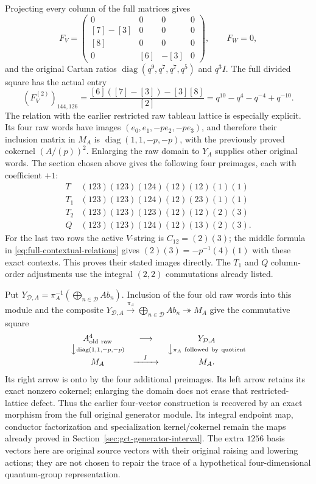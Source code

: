 Projecting every column of the full matrices gives
\[
 F_V=\begin{pmatrix}0&0&0&0\\
 [7]-[3]&0&0&0\\{}[8]&0&0&0\\0&[6]&-[3]&0
 \end{pmatrix},\qquad F_W=0,
\]
and the original Cartan ratios
$\operatorname{diag}(q^9,q^7,q^7,q^5)$ and $q^3I$.
The full divided square has the actual entry
\[
 (F_V^{(2)})_{144,126}
 =\frac{[6]([7]-[3])-[3][8]}{[2]}
 =q^{10}-q^4-q^{-4}+q^{-10}.
\]
The relation with the earlier restricted raw tableau lattice
is especially explicit. Its four raw words have images
$(e_0,e_1,-pe_2,-pe_3)$, and therefore their inclusion matrix
in $M_A$ is $\operatorname{diag}(1,1,-p,-p)$, with the
previously proved cokernel $(A/(p))^2$. Enlarging the raw
domain to $Y_A$ supplies other original words. The section
chosen above gives the following four preimages, each with
coefficient $+1$:
\[
\begin{array}{c|l}
T&(123)(123)(124)(12)(12)(1)(1)\\
T_1&(123)(123)(124)(12)(23)(1)(1)\\
T_2&(123)(123)(123)(12)(12)(2)(3)\\
Q&(123)(123)(124)(12)(13)(2)(3).
\end{array}
\]
For the last two rows the active $V$-string is $C_{12}=(2)(3)$;
the middle formula in \eqref{eq:full-contextual-relations}
gives $(2)(3)=-p^{-1}(4)(1)$ with these exact contexts.
This proves their stated images directly. The $T_1$ and
$Q$ column-order adjustments use the integral $(2,2)$
commutations already listed.

Put $Y_{\mathcal D,A}=\pi_A^{-1}
(\bigoplus_{n\in\mathcal D}Ab_n)$. Inclusion of the four
old raw words into this module and the composite
$Y_{\mathcal D,A}\xrightarrow{\pi_A}
\bigoplus_{n\in\mathcal D}Ab_n\twoheadrightarrow M_A$
give the commutative square
\[
\begin{array}{ccc}
A^4_{\rm old\ raw}&\longrightarrow&Y_{\mathcal D,A}\\
\big\downarrow{\scriptstyle\operatorname{diag}(1,1,-p,-p)}
 &&\big\downarrow{\scriptstyle\pi_A\ {\rm followed\ by\ quotient}}\\
M_A&\xrightarrow{\quad I\quad}&M_A.
\end{array}
\]
Its right arrow is onto by the four additional preimages.
Its left arrow retains its exact nonzero cokernel; enlarging
the domain does not erase that restricted-lattice defect.
Thus the earlier four-vector construction is recovered by
an exact morphism from the full original generator module.
Its integral endpoint map, conductor factorization and
specialization kernel/cokernel remain the maps already
proved in Section~\ref{sec:gct-generator-interval}.
The extra $1256$ basis vectors here are original source
vectors with their original raising and lowering actions;
they are not chosen to repair the trace of a hypothetical
four-dimensional quantum-group representation.
